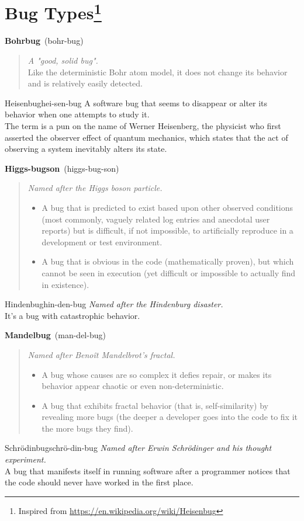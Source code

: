 \documentclass[10pt,a4paper,landscape]{article}
\newcommand{\entry}[4]{
    \textbf{#1}\ {(#2)}
    \begin{quote}
        {#3}
    \end{quote}
}
\begin{document}

\section*{Bug Types\footnote{Inspired from \url{https://en.wikipedia.org/wiki/Heisenbug}}}

\entry{Bohrbug}{bohr-bug}
{
    \emph{A "good, solid bug".} \\
    Like the deterministic Bohr atom model, it does not change its
    behavior and is relatively easily detected.
}

\entry{Heisenbug}{hei-sen-bug}
{
    A software bug that seems to disappear or alter its behavior when one
    attempts to study it. \\
    The term is a pun on the name of Werner Heisenberg, the physicist who
    first asserted the observer effect of quantum mechanics, which states
    that the act of observing a system inevitably alters its state.
}

\entry{Higgs-bugson}{higgs-bug-son}
{
    \emph{Named after the Higgs boson particle.}
    \begin{itemize}
        \item A bug that is predicted to exist based upon other observed
            conditions (most commonly, vaguely related log entries and
            anecdotal user reports) but is difficult, if not impossible, to
            artificially reproduce in a development or test environment.
        \item A bug that is obvious in the code (mathematically proven),
            but which cannot be seen in execution (yet difficult or
            impossible to actually find in existence).
    \end{itemize}
}

\entry{Hindenbug}{hin-den-bug}
{
    \emph{Named after the Hindenburg disaster.} \\
    It's a bug with catastrophic behavior.
}

\entry{Mandelbug}{man-del-bug}
{
    \emph{Named after Benoît Mandelbrot's fractal.}
    \begin{itemize}
        \item A bug whose causes are so complex it defies repair, or makes
            its behavior appear chaotic or even non-deterministic.
        \item A bug that exhibits fractal behavior (that is,
            self-similarity) by revealing more bugs (the deeper a developer
            goes into the code to fix it the more bugs they find).
    \end{itemize}
}

\entry{Schrödinbug}{schrö-din-bug}
{
    \emph{Named after Erwin Schrödinger and his thought experiment.} \\
    A bug that manifests itself in running software after a programmer
    notices that the code should never have worked in the first place.
}
\end{document}
